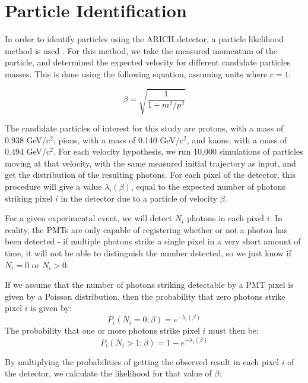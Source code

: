 
\chapter{Particle Identification}
\label{ch:Results}
In order to identify particles using the \ac{ARICH} detector, a particle likelihood method is used \cite{richImpact, belleArich}.
For this method, we take the measured momentum of the particle, and determined the expected velocity for different candidate particles masses. This is done using the following equation, assuming units where $c = 1$:

\begin{equation}
\label{eq:relMass}
 \beta = \sqrt{\frac{1}{1 +m^2 / p^2}}
\end{equation}

The candidate particles of interest for this study are protons, with a mass of 0.938 GeV/c$^2$, pions, with a mass of 0.140 GeV/c$^2$, and kaons, with a mass of 0.494 GeV/c$^2$. 
For each velocity hypothesis, we run 10,000 simulations of particles moving at that velocity, with the same measured initial trajectory as input, and get the distribution of the resulting photons.
For each pixel of the detector, this procedure will give a value $\lambda_i(\beta)$, equal to the expected number of photons striking pixel $i$ in the detector due to a particle of velocity $\beta$. 

For a given experimental event, we will detect $N_i$ photons in each pixel $i$.
In reality, the PMTs are only capable of registering whether or not a photon has been detected - if multiple photons strike a single pixel in a very short amount of time, it will not be able to distinguish the number detected, so we just know if $N_i = 0$ or $N_i > 0$.

If we assume that the number of photons striking detectable by a PMT pixel is given by a Poisson distribution, then the probability that zero photons strike pixel $i$ is given by:
$$ P_i(N_i=0; \beta) = e^{-\lambda_i(\beta)} $$
 The probability that one or more photons strike pixel $i$ must then be:
$$ P_i(N_i>1; \beta) = 1 - e^{-\lambda_i(\beta)} $$

By multiplying the probabilities of getting the observed result in each pixel $i$ of the detector, we calculate the likelihood for that value of $\beta$:

